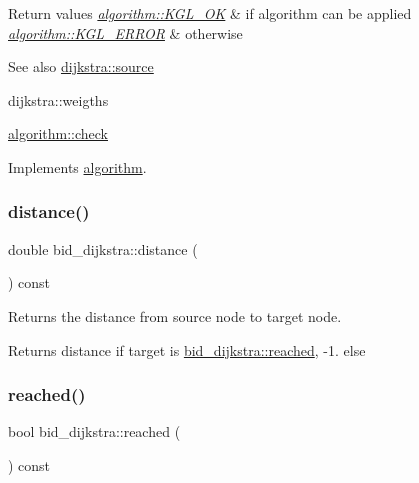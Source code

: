 \begin{DoxyRetVals}{Return values}
{\em \mbox{\hyperlink{classalgorithm_af1a0078e153aa99c24f9bdf0d97f6710aae4c1cd7fe8d8cf4b143241a6e7c31cf}{algorithm\+::\+K\+G\+L\+\_\+\+OK}}} & if algorithm can be applied \\
\hline
{\em \mbox{\hyperlink{classalgorithm_af1a0078e153aa99c24f9bdf0d97f6710ae67bf27b2ef31f73e545a7f9f4a69556}{algorithm\+::\+K\+G\+L\+\_\+\+E\+R\+R\+OR}}} & otherwise\\
\hline
\end{DoxyRetVals}
\begin{DoxySeeAlso}{See also}
\mbox{\hyperlink{classdijkstra_a9689f2628f76ddb3747ea18c91bd7041}{dijkstra\+::source}} 

dijkstra\+::weigths 

\mbox{\hyperlink{classalgorithm_a76361fb03ad1cf643affc51821e43bed}{algorithm\+::check}} 
\end{DoxySeeAlso}


Implements \mbox{\hyperlink{classalgorithm_a76361fb03ad1cf643affc51821e43bed}{algorithm}}.

\mbox{\label{classbid__dijkstra_a6150beb75d59f16d0332f42d5ff7e3f3}} 
\subsubsection{\texorpdfstring{distance()}{distance()}}
{\footnotesize\ttfamily double bid\+\_\+dijkstra\+::distance (\begin{DoxyParamCaption}{ }\end{DoxyParamCaption}) const}



Returns the distance from source node to target node. 

\begin{DoxyReturn}{Returns}
distance if target is \mbox{\hyperlink{classbid__dijkstra_a97f599b54fe9b030d87474898ff4a64c}{bid\+\_\+dijkstra\+::reached}}, {\ttfamily -\/1.} else 
\end{DoxyReturn}
\mbox{\label{classbid__dijkstra_a97f599b54fe9b030d87474898ff4a64c}} 
\subsubsection{\texorpdfstring{reached()}{reached()}}
{\footnotesize\ttfamily bool bid\+\_\+dijkstra\+::reached (\begin{DoxyParamCaption}{ }\end{DoxyParamCaption}) const}



